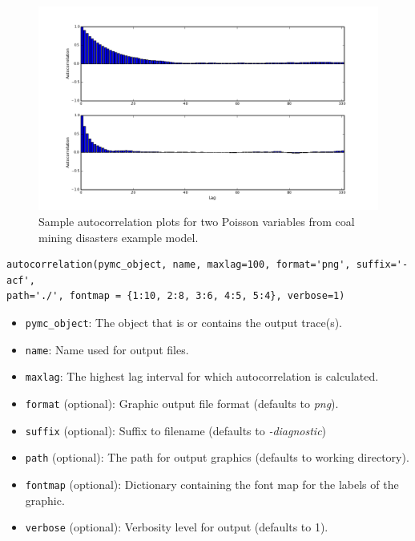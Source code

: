 \begin{figure}[h]
        \begin{center}
        \includegraphics[scale=0.4]{autocorr.png}
    \end{center}
    \caption{Sample autocorrelation plots for two Poisson variables from
coal mining disasters example model.}
    \label{fig:autocorr}
\end{figure}

\begin{verbatim}
autocorrelation(pymc_object, name, maxlag=100, format='png', suffix='-acf',
path='./', fontmap = {1:10, 2:8, 3:6, 4:5, 5:4}, verbose=1)
\end{verbatim}
\begin{itemize}
	\item \verb=pymc_object=: The object that is or contains the output
trace(s).

	\item \verb=name=: Name used for output files.

	\item \verb=maxlag=: The highest lag interval for which
autocorrelation is calculated.

	\item \verb=format= (optional): Graphic output file format
(defaults to \emph{png}).

	\item \verb=suffix= (optional): Suffix to filename (defaults to
\emph{-diagnostic})

	\item \verb=path= (optional): The path for output graphics
(defaults to working directory).

	\item \verb=fontmap= (optional): Dictionary containing the font map
for the labels of the graphic.

	\item \verb=verbose= (optional): Verbosity level for output
(defaults to 1).
\end{itemize}


